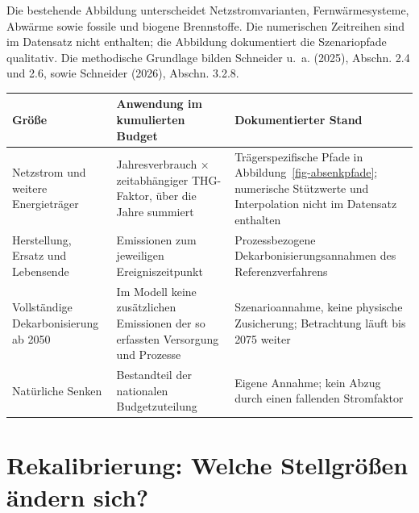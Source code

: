 \documentclass[
  ngerman,
  a4paper,
  DIV=11]{scrreprt}
\newcounter{none} %
\begin{document}
Die bestehende Abbildung unterscheidet Netzstromvarianten,
Fernwärmesysteme, Abwärme sowie fossile und biogene Brennstoffe. Die
numerischen Zeitreihen sind im Datensatz nicht enthalten; die Abbildung
dokumentiert die Szenariopfade qualitativ. Die methodische Grundlage
bilden Schneider u.~a. (2025), Abschn. 2.4 und 2.6, sowie Schneider
(2026), Abschn. 3.2.8.

{\def\LTcaptype{none} %
\begin{longtable}[]{@{}
  >{\raggedright\arraybackslash}p{}
  >{\raggedright\arraybackslash}p{}
  >{\raggedright\arraybackslash}p{}@{}}
\toprule\noalign{}
\begin{minipage}[b]{\linewidth}\raggedright
Größe
\end{minipage} & \begin{minipage}[b]{\linewidth}\raggedright
Anwendung im kumulierten Budget
\end{minipage} & \begin{minipage}[b]{\linewidth}\raggedright
Dokumentierter Stand
\end{minipage} \\
\midrule\noalign{}
\endhead
\bottomrule\noalign{}
\endlastfoot
Netzstrom und weitere Energieträger & Jahresverbrauch × zeitabhängiger
THG-Faktor, über die Jahre summiert & Trägerspezifische Pfade in
Abbildung~\ref{fig-absenkpfade}; numerische Stützwerte und Interpolation
nicht im Datensatz enthalten \\
Herstellung, Ersatz und Lebensende & Emissionen zum jeweiligen
Ereigniszeitpunkt & Prozessbezogene Dekarbonisierungsannahmen des
Referenzverfahrens \\
Vollständige Dekarbonisierung ab 2050 & Im Modell keine zusätzlichen
Emissionen der so erfassten Versorgung und Prozesse & Szenarioannahme,
keine physische Zusicherung; Betrachtung läuft bis 2075 weiter \\
Natürliche Senken & Bestandteil der nationalen Budgetzuteilung & Eigene
Annahme; kein Abzug durch einen fallenden Stromfaktor \\
\end{longtable}
}

\section{Rekalibrierung: Welche Stellgrößen ändern
sich?}\label{rekalibrierung-welche-stellgruxf6uxdfen-uxe4ndern-sich}
\end{document}
